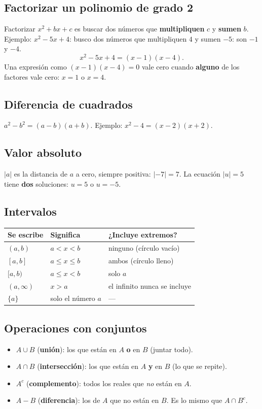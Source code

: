 \documentclass[11pt,a4paper]{article}
\begin{document}
\subsection{Factorizar un polinomio de grado 2}
Factorizar $x^2+bx+c$ es buscar dos números que \textbf{multipliquen} $c$ y \textbf{sumen} $b$.
Ejemplo: $x^2-5x+4$: busco dos números que multipliquen $4$ y sumen $-5$: son $-1$ y $-4$.
\[ x^2-5x+4=(x-1)(x-4). \]
Una expresión como $(x-1)(x-4)=0$ vale cero cuando \textbf{alguno} de los factores vale cero: $x=1$ o $x=4$.

\subsection{Diferencia de cuadrados}
$a^2-b^2=(a-b)(a+b)$. Ejemplo: $x^2-4=(x-2)(x+2)$.

\subsection{Valor absoluto}
$|a|$ es la distancia de $a$ a cero, siempre positiva: $|-7|=7$.
La ecuación $|u|=5$ tiene \textbf{dos} soluciones: $u=5$ o $u=-5$.

\subsection{Intervalos}
\begin{center}
\begin{tabular}{lll}
\toprule
\textbf{Se escribe} & \textbf{Significa} & \textbf{¿Incluye extremos?}\\ \midrule
$(a,b)$ & $a<x<b$ & ninguno (círculo vacío)\\
$[a,b]$ & $a\le x\le b$ & ambos (círculo lleno)\\
$[a,b)$ & $a\le x<b$ & solo $a$\\
$(a,\infty)$ & $x>a$ & el infinito nunca se incluye\\
$\{a\}$ & solo el número $a$ & --- \\ \bottomrule
\end{tabular}
\end{center}

\subsection{Operaciones con conjuntos}
\begin{itemize}[nosep]
  \item $A\cup B$ (\textbf{unión}): los que están en $A$ \textbf{o} en $B$ (juntar todo).
  \item $A\cap B$ (\textbf{intersección}): los que están en $A$ \textbf{y} en $B$ (lo que se repite).
  \item $A^c$ (\textbf{complemento}): todos los reales que \emph{no} están en $A$.
  \item $A-B$ (\textbf{diferencia}): los de $A$ que no están en $B$. Es lo mismo que $A\cap B^c$.
\end{itemize}
\end{document}
